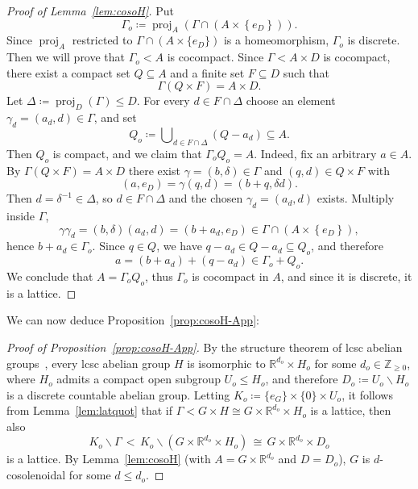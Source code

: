 \documentclass{amsart}
\numberwithin{equation}{subsection}
\theoremstyle{remark}
\begin{document}
\begin{proof}[Proof of Lemma~\ref{lem:cosoH}]
Put
\[\Gamma_{o}\coloneqq\operatorname{proj}_{A}\left(\Gamma\cap\left(A\times\left\{e_{D}\right\}\right)\right).\]
Since \(\operatorname{proj}_{A}\) restricted to \(\Gamma\cap\left(A\times\{e_{D}\}\right)\) is a homeomorphism, \(\Gamma_{o}\) is discrete. Then we will prove that \(\Gamma_{o}<A\) is cocompact. Since \(\Gamma<A\times D\) is cocompact, there exist a compact set \(Q\subseteq A\) and a finite set \(F\subseteq D\) such that
\[\Gamma\left(Q\times F\right)=A\times D.\]
Let \(\Delta\coloneqq\operatorname{proj}_{D}\left(\Gamma\right)\leq D\). For every \(d\in F\cap\Delta\) choose an element \(\gamma_{d}=\left(a_{d},d\right)\in\Gamma\), and set
\[Q_{o}\coloneqq\bigcup\nolimits_{d\in F\cap\Delta}\left(Q-a_{d}\right)\subseteq A.\]
Then \(Q_{o}\) is compact, and we claim that \(\Gamma_{o}Q_{o}=A\). Indeed, fix an arbitrary \(a\in A\). By \(\Gamma\left(Q\times F\right)=A\times D\) there exist
\(\gamma=\left(b,\delta\right)\in\Gamma\) and \(\left(q,d\right)\in Q\times F\) with
\[\left(a,e_{D}\right)=\gamma\left(q,d\right)=\left(b+q,\delta d\right).\]
Then \(d=\delta^{-1}\in\Delta\), so \(d\in F\cap\Delta\) and the chosen
\(\gamma_{d}=\left(a_{d},d\right)\) exists. Multiply inside \(\Gamma\),
\[\gamma\gamma_{d}=\left(b,\delta\right)\left(a_{d},d\right)=\left(b+a_{d},e_{D}\right)\in\Gamma\cap\left(A\times\left\{e_{D}\right\}\right),\]
hence \(b+a_{d}\in\Gamma_{o}\). Since \(q\in Q\), we have \(q-a_{d}\in Q-a_{d}\subseteq Q_{o}\), and therefore
\[a=\left(b+a_{d}\right)+\left(q-a_{d}\right)\in\Gamma_{o}+Q_{o}.\]
We conclude that \(A=\Gamma_{o}Q_{o}\), thus \(\Gamma_{o}\) is cocompact in \(A\), and since it is discrete, it is a lattice.
\end{proof}

We can now deduce Proposition~\ref{prop:cosoH-App}:

\begin{proof}[Proof of Proposition~\ref{prop:cosoH-App}]
By the structure theorem of lcsc abelian groups~\cite[Theorem 24.30]{HewittRoss}, every lcsc abelian group \(H\) is isomorphic to \(\mathbb{R}^{d_{o}}\times H_{o}\) for some \(d_{o}\in\mathbb{Z}_{\geq 0}\), where \(H_{o}\) admits a compact open subgroup \(U_{o}\leq H_{o}\), and therefore \(D_{o}\coloneqq U_{o}\backslash H_{o}\) is a discrete countable abelian group. Letting \(K_{o}\coloneqq\{e_{G}\}\times\{0\}\times U_{o}\), it follows from Lemma~\ref{lem:latquot} that if \(\Gamma<G\times H\cong G\times\mathbb{R}^{d_{o}}\times H_{o}\) is a lattice, then also
\[K_{o}\backslash\Gamma\,<\,K_{o}\backslash\left(G\times\mathbb{R}^{d_{o}}\times H_{o}\right)\,\cong\,G\times\mathbb{R}^{d_{o}}\times D_{o}\]
is a lattice. By Lemma~\ref{lem:cosoH} (with \(A=G\times\mathbb{R}^{d_{o}}\) and \(D=D_{o}\)), \(G\) is \(d\)-cosolenoidal for some \(d\leq d_{o}\).
\end{proof}
\end{document}
